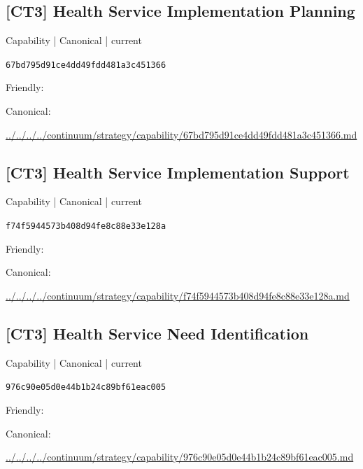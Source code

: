 \documentclass[10pt,a4paper]{article}
\begin{document}
\subsection*{[CT3] Health Service Implementation Planning}
{\small Capability | Canonical | current}\par
\texttt{67bd795d91ce4dd49fdd481a3c451366}\par
Friendly: \par
Canonical: \par
{\footnotesize\url{../../../../continuum/strategy/capability/67bd795d91ce4dd49fdd481a3c451366.md}}\par
\subsection*{[CT3] Health Service Implementation Support}
{\small Capability | Canonical | current}\par
\texttt{f74f5944573b408d94fe8c88e33e128a}\par
Friendly: \par
Canonical: \par
{\footnotesize\url{../../../../continuum/strategy/capability/f74f5944573b408d94fe8c88e33e128a.md}}\par
\subsection*{[CT3] Health Service Need Identification}
{\small Capability | Canonical | current}\par
\texttt{976c90e05d0e44b1b24c89bf61eac005}\par
Friendly: \par
Canonical: \par
{\footnotesize\url{../../../../continuum/strategy/capability/976c90e05d0e44b1b24c89bf61eac005.md}}\par
\end{document}
